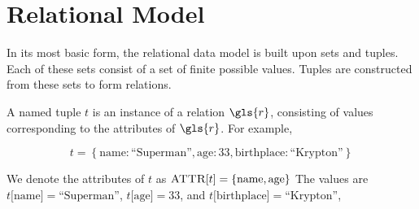 \section{Relational Model}
	In its most basic form, the relational data model is built upon sets and tuples.  Each of these sets consist of a set of finite possible values.  Tuples are constructed from these sets to form relations.
	
	\begin{defn}
	\label{def:named-tuple}
		A named tuple $t$ is an instance of a relation $\gls{r}$, consisting of values corresponding to the attributes of $\gls{r}$.  For example,
		
		$$t = \left\{\mathrm{name}: \textrm{``Superman''}, \mathrm{age}: 33, \mathrm{birthplace}: \textrm{``Krypton''}\right\}$$
		
		We denote the attributes of $t$ as $\textsc{ATTR}\lbrack t\rbrack = \left\{\mathrm{name}, \mathrm{age}\right\}$  The values are $t\lbrack \mathrm{name}\rbrack = \textrm{``Superman''}$, $t\lbrack \mathrm{age}\rbrack = 33$, and $t\lbrack \mathrm{birthplace}\rbrack = \textrm{``Krypton''}$,
	\end{defn}
	
